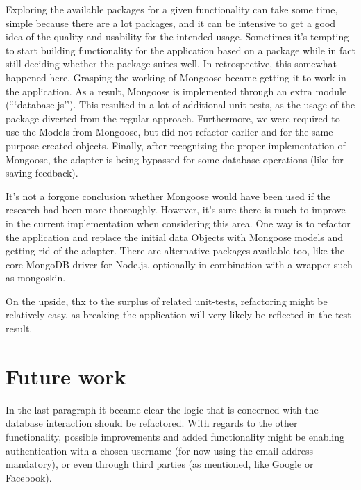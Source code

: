 Exploring the available packages for a given functionality can take some time,
simple because there are a lot packages, and it can be intensive to get a good
idea of the quality and usability for the intended usage. Sometimes it's
tempting to start building functionality for the application based on a package
while in fact still deciding whether the package suites well. In retrospective,
this somewhat happened here. Grasping the working of Mongoose became getting it
to work in the application. As a result, Mongoose is implemented through an 
extra module (```database.js''). This resulted in a lot of additional 
unit-tests, as the usage of the package diverted from the regular approach. 
Furthermore, we were required to use the Models from Mongoose, but did not
refactor earlier and for the same purpose created objects. Finally, after 
recognizing the proper implementation of Mongoose, the adapter is being bypassed
for some database operations (like for saving feedback).

It's not a forgone conclusion whether Mongoose would have been used if the
research had been more thoroughly. However, it's sure there is much to improve
in the current implementation when considering this area. One way is to refactor
the application and replace the initial data Objects with Mongoose models and
getting rid of the adapter. There are alternative packages available too, like 
the core MongoDB driver for Node.js, optionally in combination with a wrapper 
such as mongoskin. 

On the upside, thx to the surplus of related unit-tests, refactoring might be 
relatively easy, as breaking the application will very likely be reflected in 
the test result.

\section{Future work}
In the last paragraph it became clear the logic that is concerned with the 
database interaction should be refactored. With regards to the other 
functionality, possible improvements and added functionality might be enabling
authentication with a chosen username (for now using the email address 
mandatory), or even through third parties 
(as mentioned, like Google or Facebook).


